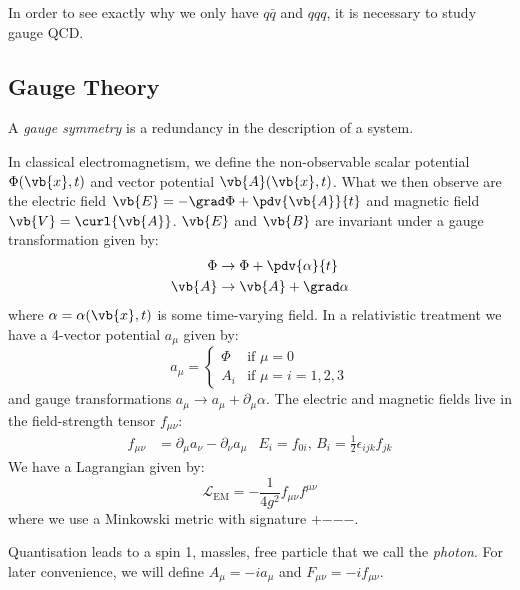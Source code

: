 \documentclass{jknotes}
\begin{document}
In order to see exactly why we only have \(q\bar{q}\) and \(qqq\), it is necessary to study gauge QCD.

\subsection{Gauge Theory}

\begin{defn}
    A \emph{gauge symmetry} is a redundancy in the description of a system.
\end{defn}

\begin{eg}
    In classical electromagnetism, we define the non-observable scalar potential \(\Phi(\vb{x},t)\) and vector potential \(\vb{A}(\vb{x},t)\). What we then observe are the electric field \(\vb{E}=-\grad\Phi+\pdv{\vb{A}}{t}\) and magnetic field \(\vb{V} = \curl{\vb{A}}\). \(\vb{E}\) and \(\vb{B}\) are invariant under a gauge transformation given by:
    \begin{align}
        \Phi &\rightarrow \Phi + \pdv{\alpha}{t} \\
        \vb{A} &\rightarrow \vb{A} + \grad\alpha
    \end{align}
    where \(\alpha = \alpha(\vb{x},t)\) is some time-varying field. In a relativistic treatment we have a 4-vector potential \(a_\mu\) given by:
    \begin{equation}
        a_\mu = 
        \begin{cases}
            \Phi & \text{if } \mu = 0 \\
            A_i & \text{if } \mu = i = 1,2,3
        \end{cases}
    \end{equation}
    and gauge transformations \(a_\mu \rightarrow a_\mu + \partial_\mu\alpha\). The electric and magnetic fields live in the field-strength tensor \(f_{\mu\nu}\):
    \begin{align}
        f_{\mu\nu} &= \partial_\mu a_\nu - \partial_\nu a_\mu
        &
        E_i = f_{0i}, \, B_i = \frac{1}{2}\epsilon_{ijk}f_{jk}
    \end{align}
    We have a Lagrangian given by:
    \begin{equation}
        \mathcal{L}_\text{EM} = -\frac{1}{4g^2}f_{\mu\nu}f^{\mu\nu}
    \end{equation}
    where we use a Minkowski metric with signature \(+\)\(-\)\(-\)\(-\).

    Quantisation leads to a spin 1, massles, free particle that we call the \emph{photon}. For later convenience, we will define \(A_\mu = -ia_\mu\) and \(F_{\mu\nu} = -if_{\mu\nu}\).
\end{eg}
\end{document}

